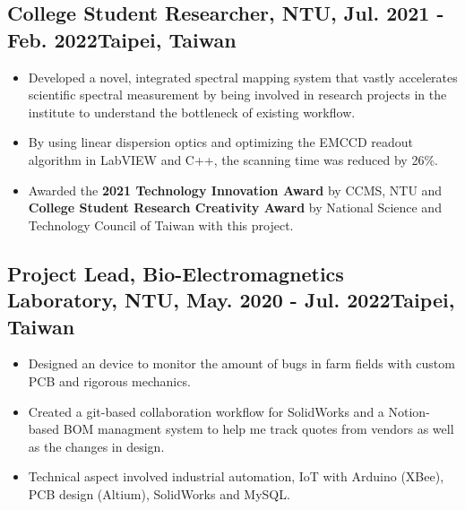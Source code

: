 \documentclass[12pt]{article}
\begin{document}
        \subsection*{College Student Researcher, NTU, Jul. 2021 - Feb. 2022\hfill Taipei, Taiwan}
        { \small
        \begin{itemize}
            \item Developed a novel, integrated spectral mapping system that vastly accelerates scientific spectral measurement by being involved in research projects in the institute to understand the bottleneck of existing workflow.
            \item By using linear dispersion optics and optimizing the EMCCD readout algorithm in LabVIEW and C++, the scanning time was reduced by 26\%.
            \item Awarded the \textbf{2021 Technology Innovation Award} by CCMS, NTU and \textbf{College Student Research Creativity Award} by National Science and Technology Council of Taiwan with this project.
        \end{itemize}}
        \subsection*{Project Lead, Bio-Electromagnetics Laboratory, NTU, May. 2020 - Jul. 2022\hfill Taipei, Taiwan}
        { \small
        \begin{itemize}
            \item Designed an device to monitor the amount of bugs in farm fields with custom PCB and rigorous mechanics.
            \item Created a git-based collaboration workflow for SolidWorks and a Notion-based BOM managment system to help me track quotes from vendors as well as the changes in design.
            \item Technical aspect involved industrial automation, IoT with Arduino (XBee), PCB design (Altium), SolidWorks and MySQL.
        \end{itemize}
        }
        
        
\end{document}
